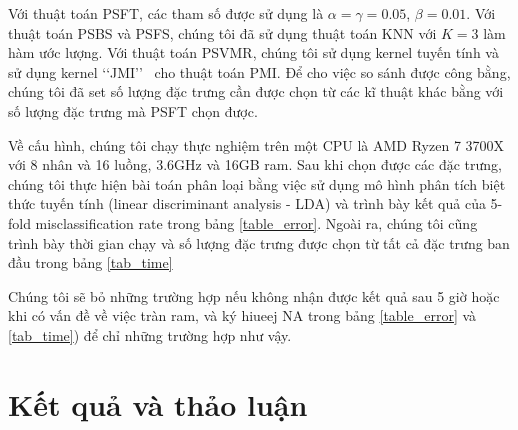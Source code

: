 Với thuật toán PSFT, các tham số được sử dụng là $\alpha=\gamma=0.05$, $\beta=0.01$. Với thuật toán PSBS và PSFS, chúng tôi đã sử dụng thuật toán KNN với $K=3$ làm hàm ước lượng. Với thuật toán PSVMR, chúng tôi sử dụng kernel tuyến tính và sử dụng kernel \lq\lq JMI\rq\rq~ cho thuật toán PMI. Để cho việc so sánh được công bằng, chúng tôi đã set số lượng đặc trưng cần được chọn từ các kĩ thuật khác bằng với số lượng đặc trưng mà PSFT chọn được.

Về cấu hình, chúng tôi chạy thực nghiệm trên một CPU là AMD Ryzen 7 3700X với 8 nhân và 16 luồng, 3.6GHz và 16GB ram. Sau khi chọn được các đặc trưng, chúng tôi thực hiện bài toán phân loại bằng việc sử dụng mô hình phân tích biệt thức tuyến tính (linear discriminant analysis - LDA) và trình bày kết quả của 5-fold misclassification rate trong bảng \ref{table_error}. Ngoài ra, chúng tôi cũng trình bày thời gian chạy và số lượng đặc trưng được chọn từ tất cả đặc trưng ban đầu trong bảng \ref{tab_time}

Chúng tôi sẽ bỏ những trường hợp nếu không nhận được kết quả sau 5 giờ hoặc khi có vấn đề về việc tràn ram, và ký hiueej NA trong bảng \ref{table_error} và \ref{tab_time}) để chỉ những trường hợp như vậy.

\section{Kết quả và thảo luận}

\begin{table*}[htbp]
	\caption{5-fold misclassification rate}
\end{table*}


